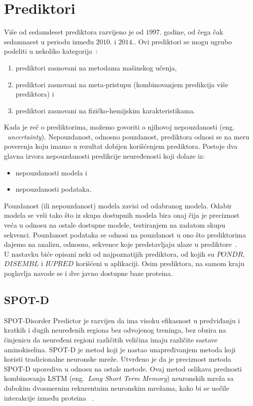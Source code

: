 \section{Prediktori}

Više od sedamdeset prediktora razvijeno je od $1997.$ godine, od čega čak sedamnaest u periodu između $2010.$ i $2014.$. Ovi prediktori se mogu ugrubo podeliti u nekoliko kategorija~\cite{PredictorsOverview}:
\begin{enumerate}
\item prediktori zasnovani na metodama mašinskog učenja,
\item prediktori zasnovani na meta-pristupu (kombinovanjem predikcija više prediktora) i 
\item prediktori zasnovani na fizičko-hemijskim karakteristikama.
\end{enumerate}

Kada je reč o prediktorima, možemo govoriti o njihovoj nepouzdanosti (eng. ~{\em  uncertainty}). Nepouzdanost, odnosno pouzdanost, prediktora odnosi se na meru poverenja koju imamo u rezultat dobijen korišćenjem prediktora. Postoje dva glavna izvora nepouzdanosti predikcije neuređenosti koji dolaze iz:
\begin{itemize}
\item nepouzdanosti modela i
\item nepouzdanosti podataka.
\end{itemize}

Pouzdanost (ili nepouzdanost) modela zavisi od odabranog modela. Odabir modela se vrši tako što iz skupa dostupnih modela bira onaj čija je preciznost veća u odnosu na ostale dostupne modele, testiranjem na zadatom skupu sekvenci. Pouzdanost podataka se odnosi na pouzdanost u ono što prediktorima dajemo na analizu, odnosno, sekvence koje predstavljaju ulaze u prediktore~\cite{MolBioSyst}.\\

U nastavku biće opisani neki od najpoznatijih prediktora, od kojih su  $PONDR$, $DISEMBL$ i $IUPRED$ korišćeni u aplikaciji. Osim prediktora, na samom kraju poglavlja navode se i dve javno dostupne baze proteina.


\subsection{SPOT-D}

SPOT-Disorder Predictor je razvijen da ima visoku efikasnost u predviđanju i kratkih i dugih neuređenih regiona bez odvojenog treninga, bez obzira na činjenicu da neuređeni regioni različitih veličina imaju različite sastave aminokiselina. SPOT-D je metod koji je nastao unapređivanjem metoda koji koristi tradicionalne neuronske mreže. Utvrđeno je da je preciznost metoda SPOT-D uporediva u odnosu na ostale metode. Ovaj metod oslikava prednosti kombinovanja LSTM (eng.~{\em Long Short Term Memory}) neuronskih mreža sa dubokim dvosmernim rekurentnim neuronskim mrežama, kako bi se uočile interakcije između proteina ~\cite{SPOTD}.
